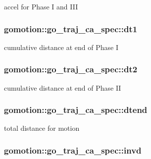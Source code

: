 accel for Phase I and I\-I\-I 

\hypertarget{structgomotion_1_1go__traj__ca__spec_a7292672497463684db1160ad31042bf9}{
\subsubsection[{dt1}]{ gomotion\-::go\-\_\-traj\-\_\-ca\-\_\-spec\-::dt1}}\label{structgomotion_1_1go__traj__ca__spec_a7292672497463684db1160ad31042bf9}


cumulative distance at end of Phase I 

\hypertarget{structgomotion_1_1go__traj__ca__spec_a8c0af79f001dc34f84c85968548c3b9b}{
\subsubsection[{dt2}]{ gomotion\-::go\-\_\-traj\-\_\-ca\-\_\-spec\-::dt2}}\label{structgomotion_1_1go__traj__ca__spec_a8c0af79f001dc34f84c85968548c3b9b}


cumulative distance at end of Phase I\-I 

\hypertarget{structgomotion_1_1go__traj__ca__spec_abbb8c4d081e5d3a58ec38b69536843c3}{
\subsubsection[{dtend}]{ gomotion\-::go\-\_\-traj\-\_\-ca\-\_\-spec\-::dtend}}\label{structgomotion_1_1go__traj__ca__spec_abbb8c4d081e5d3a58ec38b69536843c3}


total distance for motion 

\hypertarget{structgomotion_1_1go__traj__ca__spec_acd3e4af0f9f0221e8760864eb89e8730}{
\subsubsection[{invd}]{ gomotion\-::go\-\_\-traj\-\_\-ca\-\_\-spec\-::invd}}\label{structgomotion_1_1go__traj__ca__spec_acd3e4af0f9f0221e8760864eb89e8730}


